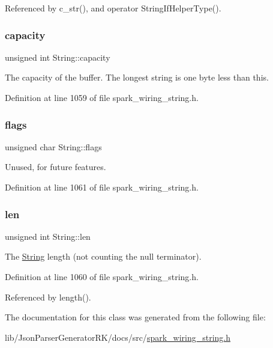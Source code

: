 Referenced by c\+\_\+str(), and operator String\+If\+Helper\+Type().

\mbox{\label{class_string_af78d6ba64d194d5571319316ee2c41d4}} 
\subsubsection{\texorpdfstring{capacity}{capacity}}
{\footnotesize\ttfamily unsigned int String\+::capacity\hspace{0.3cm}{\ttfamily [protected]}}



The capacity of the buffer. The longest string is one byte less than this. 



Definition at line 1059 of file spark\+\_\+wiring\+\_\+string.\+h.

\mbox{\label{class_string_a46d9dadfcefa61aa12563806c477657b}} 
\subsubsection{\texorpdfstring{flags}{flags}}
{\footnotesize\ttfamily unsigned char String\+::flags\hspace{0.3cm}{\ttfamily [protected]}}



Unused, for future features. 



Definition at line 1061 of file spark\+\_\+wiring\+\_\+string.\+h.

\mbox{\label{class_string_add7c3370b556b8fd8c669b8c6b40043a}} 
\subsubsection{\texorpdfstring{len}{len}}
{\footnotesize\ttfamily unsigned int String\+::len\hspace{0.3cm}{\ttfamily [protected]}}



The \hyperlink{class_string}{String} length (not counting the null terminator). 



Definition at line 1060 of file spark\+\_\+wiring\+\_\+string.\+h.



Referenced by length().



The documentation for this class was generated from the following file\+:\begin{DoxyCompactItemize}
\item 
lib/\+Json\+Parser\+Generator\+R\+K/docs/src/\hyperlink{spark__wiring__string_8h}{spark\+\_\+wiring\+\_\+string.\+h}\end{DoxyCompactItemize}
